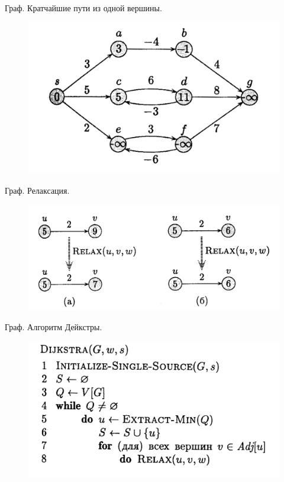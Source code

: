 \documentclass[10pt]{beamer}
\begin{document}
\begin{frame}{Граф. Кратчайшие пути из одной вершины.}
\begin{figure}
\centerline{\includegraphics[width=1.0\linewidth]{images/closest1.png}}
\end{figure}
\end{frame}

\begin{frame}{Граф. Релаксация.}
\begin{figure}
\centerline{\includegraphics[width=1.0\linewidth]{images/relax.png}}
\end{figure}
\end{frame}

\begin{frame}{Граф. Алгоритм Дейкстры.}
\begin{figure}
\centerline{\includegraphics[width=1.0\linewidth]{images/deicstra_algo.png}}
\end{figure}
\end{frame}
\end{document}
